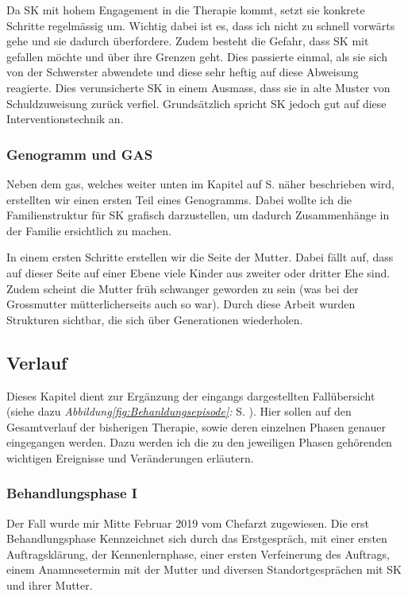 Da SK mit hohem Engagement in die Therapie kommt, setzt sie konkrete Schritte regelmässig um. Wichtig dabei ist es, dass ich nicht zu schnell vorwärts gehe und sie dadurch überfordere. Zudem besteht die Gefahr, dass SK mit gefallen möchte und über ihre Grenzen geht. Dies passierte einmal, als sie sich von der Schwerster abwendete und diese sehr heftig auf diese Abweisung reagierte. Dies verunsicherte SK in einem Ausmass, dass sie in alte Muster von Schuldzuweisung zurück verfiel. Grundsätzlich spricht SK jedoch gut auf diese Interventionstechnik an.

\subsubsection{Genogramm und GAS}
Neben dem \ac{gas}, welches weiter unten im Kapitel \textit{} auf S. \pageref{sec:Evaluationsverfahren} näher beschrieben wird, erstellten wir einen ersten Teil eines Genogramms. Dabei wollte ich die Familienstruktur für SK grafisch darzustellen, um dadurch Zusammenhänge in der Familie ersichtlich zu machen. 

In einem ersten Schritte erstellen wir die Seite der Mutter. Dabei fällt auf, dass auf dieser Seite auf einer Ebene viele Kinder aus zweiter oder dritter Ehe sind. Zudem scheint die Mutter früh schwanger geworden zu sein (was bei der Grossmutter mütterlicherseits auch so war). Durch diese Arbeit wurden Strukturen sichtbar, die sich über Generationen wiederholen.

\subsection{Verlauf}\label{Verlauf} 
Dieses Kapitel dient zur Ergänzung der eingangs dargestellten Fallübersicht (siehe dazu \textit{Abbildung\ref{fig:Behanldungsepisode}: } S. \pageref{fig:Behanldungsepisode}). Hier sollen auf den Gesamtverlauf der bisherigen Therapie, sowie deren einzelnen Phasen genauer eingegangen werden. Dazu werden ich die zu den jeweiligen Phasen gehörenden wichtigen Ereignisse und Veränderungen erläutern. 
 
\subsubsection{Behandlungsphase I}
Der Fall wurde mir Mitte Februar 2019 vom Chefarzt zugewiesen. Die erst Behandlungsphase Kennzeichnet sich durch das Erstgespräch, mit einer ersten Auftragsklärung, der Kennenlernphase, einer ersten Verfeinerung des Auftrags, einem Anamnesetermin mit der Mutter und diversen Standortgesprächen mit SK und ihrer Mutter. 

